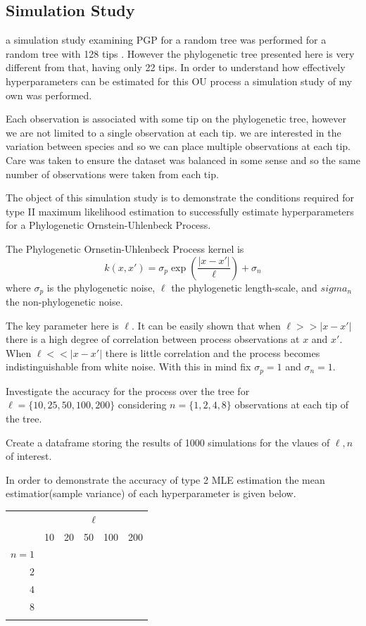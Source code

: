 \documentclass[wsdraft]{ws-rv9x6} %
\begin{document}
\subsection{Simulation Study}

a simulation study examining PGP for a random tree was performed for a random tree with 128 tips \cite{hadjipantelis2013function}. However the phylogenetic tree presented here is very different from that, having only 22 tips. In order to understand how effectively hyperparameters can be estimated for this OU process a simulation study of my own was performed.

Each observation is associated with some tip on the phylogenetic tree, however we are not limited to a single observation at each tip. we are interested in the variation between species and so we can place multiple observations at each tip. Care was taken to ensure the dataset was balanced in some sense and so the same number of observations were taken from each tip.

The object of this simulation study is to demonstrate the conditions required for type II maximum likelihood estimation to successfully estimate hyperparameters for a Phylogenetic Ornstein-Uhlenbeck Process.

The Phylogenetic Ornsetin-Uhlenbeck Process kernel is
\[
k(x,x') = \sigma_p \exp \left( \frac{|x - x'|}{\ell} \right)  + \sigma_n
\]
where \(\sigma_p\) is the phylogenetic noise, \(\ell\) the phylogenetic length-scale, and \(sigma_n\) the non-phylogenetic noise.

The key parameter here is \(\ell\). It can be easily shown that when \(\ell >> |x - x'|\) there is a high degree of correlation between process observations at \(x\) and \(x'\). When \(\ell << |x - x'|\) there is little correlation and the process becomes indistinguishable from white noise. With this in mind fix \(\sigma_p = 1\) and \(\sigma_n = 1\).

Investigate the accuracy for the process over the tree for \(\ell = \{10, 25, 50, 100, 200\}\) considering \(n = \{1, 2, 4, 8\}\) observations at each tip of the tree.

Create a dataframe storing the results of 1000 simulations for the vlaues of \(\ell, n \) of interest.

In order to demonstrate the accuracy of type 2 MLE estimation  the mean estimatior(sample variance) of each hyperparameter is given below.

\begin{table}[ht]
	{\begin{tabular}{@{}rccccc@{}} \toprule
			& \multicolumn{5}{c}{\(\ell\)} \\
			& 10 & 20 & 50 & 100 & 200 \\ 
			\colrule
			\(n = 1\)  &&&& \\
			\(2\)  &&&& \\
			\(4\)  &&&& \\
			\(8\)  &&&& \\
			\botrule
		\end{tabular}
	}
	\label{tab::simulation}
\end{table}
\end{document}
